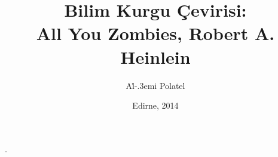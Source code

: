 \documentclass[12pt,a4paper,oneside,article]{memoir}
\title{Bilim Kurgu Çevirisi:\\All You Zombies, Robert A. Heinlein}
\author{Al\.{}\kern-.3emi Polatel} %
\date{Edirne, 2014} %
\begin{document}
\OnehalfSpacing

\calccentering{\unitlength}
\begin{adjustwidth*}{\unitlength}{-\unitlength}
  \begin{adjustwidth}{-1cm}{-1cm}
    \begin{titlingpage}
      \maketitle
    \end{titlingpage}
  \end{adjustwidth}
\end{adjustwidth*}

\frontmatter







\tableofcontents

\mainmatter
\pagestyle{simple}




\appendix
\appendixpage
\addappheadtotoc
{}


\backmatter


\end{document}
